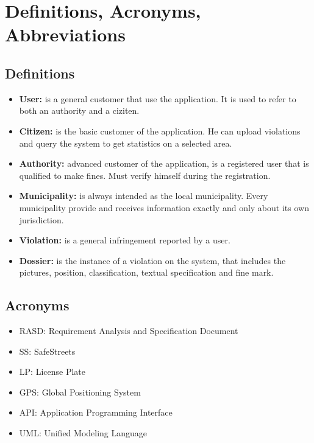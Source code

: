 \documentclass[../RASD.tex]{subfiles}
\begin{document}
    \section{Definitions, Acronyms, Abbreviations}\label{sec:definitions,-acronyms,-abbreviations}
    \subsection{Definitions}\label{subsec:definitions}
    \begin{itemize}
        \item \textbf{User:} is a general customer that use the application. It is used to refer to both an authority and a ciziten.
        \item \textbf{Citizen:} is the basic customer of the application. He can upload violations and query the system to get statistics on a selected area.
        \item \textbf{Authority:} advanced customer of the application, is a registered user that is qualified to make fines. Must verify himself during the registration.
        \item \textbf{Municipality:} is always intended as the local municipality. Every municipality provide and receives information exactly and only about its own jurisdiction.
        \item \textbf{Violation:} is a general infringement reported by a user.
        \item  \textbf{Dossier:} is the instance of a violation on the system, that includes the pictures, position, classification, textual specification and fine mark.
    \end{itemize}

    \subsection{Acronyms}\label{subsec:acronyms}
    \begin{itemize}
        \item RASD: Requirement Analysis and Specification Document
        \item SS: SafeStreets
        \item LP: License Plate
        \item GPS: Global Positioning System
        \item API: Application Programming Interface
        \item UML: Unified Modeling Language
    \end{itemize}
\end{document}
